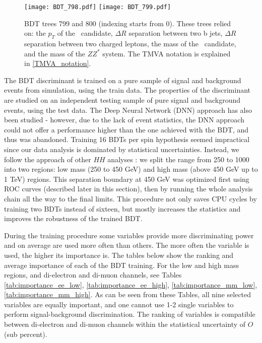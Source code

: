 \begin{figure}[H]
\begin{center}
\texttt{[image: BDT\_798.pdf]}
\texttt{[image: BDT\_799.pdf]}\\
\caption[BDT trees 799 and 800.]{BDT trees 799 and 800 (indexing starts from 0). These trees relied on: the $p_T$ of the \Zll~candidate, 
$\Delta R$ separation between two b jets,
$\Delta R$ separation between two charged leptons, 
the mass of the \HBB~candidate, and the mass of the $ZZ^*$ system. The TMVA notation is explained in \ref{TMVA_notation}.} 
\label{fig:bdt_trees_3}
\end{center}
\end{figure}

The BDT discriminant is trained on a pure sample of signal and background events from simulation, using the train data. The properties of the discriminant are studied on an independent testing sample of pure signal and background events, using the test data. The Deep Neural Network (DNN) approach has also been studied - however, due to the lack of event statistics, the DNN approach could not offer a performance higher than the one achieved with the BDT, and thus was abandoned. Training 16 BDTs per spin hypothesis seemed impractical since our data analysis is dominated by statistical uncertainties. Instead, we follow the approach of other $HH$ analyses \cite{HH_combination}: we split the range from 250 to 1000 into two regions: low mass (250 to 450 GeV) and high mass (above 450 GeV up to 1 TeV) regions. This separation boundary at 450 GeV was optimized first using ROC curves (described later in this section), then by running the whole analysis chain all the way to the final limits. This procedure not only saves CPU cycles by training two BDTs instead of sixteen, but mostly increases the statistics and improves the robustness of the trained BDT. 

During the training procedure some variables provide more discriminating power and on average are used more often than others. The more often the variable is used, the higher its importance is. The tables below show the ranking and average importance of each of the BDT training. For the low and high mass regions, and di-electron and di-muon channels, see Tables \ref{tab:importance_ee_low}, \ref{tab:importance_ee_high}, \ref{tab:importance_mm_low}, \ref{tab:importance_mm_high}. As can be seen from these Tables, all nine selected variables are equally important, and one cannot use 1-2 single variables to perform signal-background discrimination. The ranking of variables is compatible between di-electron and di-muon channels within the statistical uncertainty of $O$(sub percent). 

